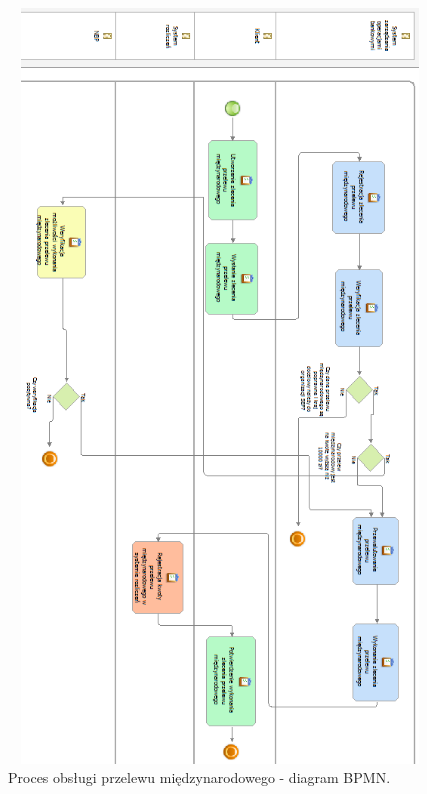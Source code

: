 \begin{figure}[h!tbp]
\begin{centering}
\includegraphics[width=12.5cm,height=20cm]{img/proces_operacja_przeleu_miedzynarodowego.png}
\caption[Proces obsługi przelewu międzynarodowego - diagram BPMN.]{Proces obsługi przelewu międzynarodowego - diagram BPMN.}\label{proces_operacja_przeleu_miedzynarodowego}
\end{centering}
\end{figure}

